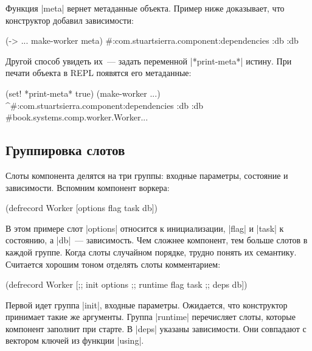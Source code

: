 Функция \spverb|meta| вернет метаданные объекта. Пример ниже доказывает, что
конструктор добавил зависимости:

\begin{english}
  \begin{clojure}
(-> {...} make-worker meta)
#:com.stuartsierra.component{:dependencies {:db :db}}
  \end{clojure}
\end{english}

Другой способ увидеть их~--- задать переменной \spverb|*print-meta*| истину. При
печати объекта в REPL появятся его метаданные:

\begin{english}
  \begin{clojure}
(set! *print-meta* true)
(make-worker {...})
^#:com.stuartsierra.component{:dependencies {:db :db}}
#book.systems.comp.worker.Worker{...}
  \end{clojure}
\end{english}

\subsection{Группировка слотов}

Слоты компонента делятся на три группы: входные параметры, состояние и
зависимости. Вспомним компонент воркера:

\begin{english}
  \begin{clojure}
(defrecord Worker
    [options flag task db])
  \end{clojure}
\end{english}

В этом примере слот \spverb|options| относится к инициализации, \spverb|flag| и
\spverb|task| к состоянию, а \spverb|db|~--- зависимость. Чем сложнее компонент,
тем больше слотов в каждой группе. Когда слоты случайном порядке, трудно понять
их семантику. Считается хорошим тоном отделять слоты комментарием:

\begin{english}
  \begin{clojure}
(defrecord Worker
    [;; init
     options
     ;; runtime
     flag
     task
     ;; deps
     db])
  \end{clojure}
\end{english}

Первой идет группа \spverb|init|, входные параметры. Ожидается, что конструктор
принимает такие же аргументы. Группа \spverb|runtime| перечисляет слоты, которые
компонент заполнит при старте. В \spverb|deps| указаны зависимости. Они
совпадают с вектором ключей из функции \spverb|using|.

